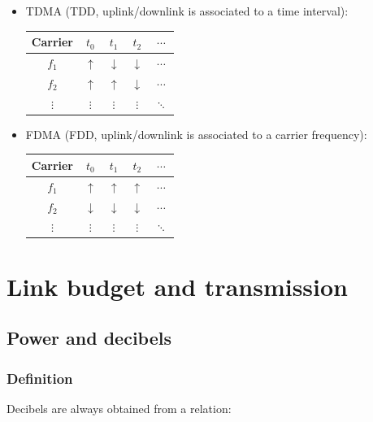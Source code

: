 \documentclass[../main.tex]{subfiles}
\begin{document}
\begin{itemize}
	\item {
		TDMA (TDD, uplink/downlink is associated to a time interval):

		\begin{table}[H]
			\centering
			\begin{tabular}{c|c|c|c|c}
				Carrier & $t_0$ & $t_1$ & $t_2$ & $\cdots$ \\
				\hline
				$f_1$ & $\uparrow$ & $\downarrow$ & $\downarrow$ & $\cdots$ \\
				\hline
				$f_2$ & $\uparrow$ & $\uparrow$ & $\downarrow$ & $\cdots$ \\
				\hline
				$\vdots$ & $\vdots$ & $\vdots$ & $\vdots$ & $\ddots$ \\
			\end{tabular}
		\end{table}
	}
	\item {
		FDMA (FDD, uplink/downlink is associated to a carrier frequency):

		\begin{table}[H]
			\centering
			\begin{tabular}{c|c|c|c|c}
				Carrier & $t_0$ & $t_1$ & $t_2$ & $\cdots$ \\
				\hline
				$f_1$ & $\uparrow$ & $\uparrow$ & $\uparrow$ & $\cdots$ \\
				\hline
				$f_2$ & $\downarrow$ & $\downarrow$ & $\downarrow$ & $\cdots$ \\
				\hline
				$\vdots$ & $\vdots$ & $\vdots$ & $\vdots$ & $\ddots$ \\
			\end{tabular}
		\end{table}
	}
\end{itemize}

\section{Link budget and transmission}

\subsection{Power and decibels}

\subsubsection{Definition}

Decibels are always obtained from a relation:
\end{document}
